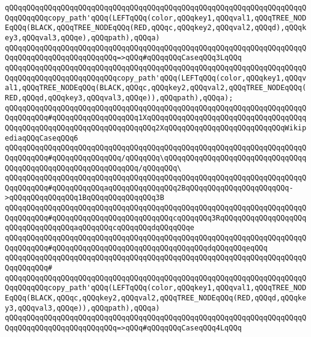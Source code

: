 \verb|qQQqqQQqqQQqqQQqqQQqqQQqqQQqqQQqqQQqqQQqqQQqqQQqqQQqqQQqqQQqqQQqqQQqqQQqqQQqqQQqcopy_path'qQQq(LEFTqQQq(color,qQQqkey1,qQQqval1,qQQqTREE_NODEqQQq(BLACK,qQQqTREE_NODEqQQq(RED,qQQqc,qQQqkey2,qQQqval2,qQQqd),qQQqkey3,qQQqval3,qQQqe),qQQqpath),qQQqa)|\newline
\verb|qQQqqQQqqQQqqQQqqQQqqQQqqQQqqQQqqQQqqQQqqQQqqQQqqQQqqQQqqQQqqQQqqQQqqQQqqQQqqQQqqQQqqQQqqQQqqQQq=>qQQq#qQQqqQQqCaseqQQq3LqQQq|\newline
\verb|qQQqqQQqqQQqqQQqqQQqqQQqqQQqqQQqqQQqqQQqqQQqqQQqqQQqqQQqqQQqqQQqqQQqqQQqqQQqqQQqqQQqqQQqqQQqqQQqcopy_path'qQQq(LEFTqQQq(color,qQQqkey1,qQQqval1,qQQqTREE_NODEqQQq(BLACK,qQQqc,qQQqkey2,qQQqval2,qQQqTREE_NODEqQQq(RED,qQQqd,qQQqkey3,qQQqval3,qQQqe)),qQQqpath),qQQqa);|\newline
\newline
\verb|qQQqqQQqqQQqqQQqqQQqqQQqqQQqqQQqqQQqqQQqqQQqqQQqqQQqqQQqqQQqqQQqqQQqqQQqqQQqqQQq#qQQqqQQqqQQqqQQqqQQq1XqQQqqQQqqQQqqQQqqQQqqQQqqQQqqQQqqQQqqQQqqQQqqQQqqQQqqQQqqQQqqQQqqQQqqQQq2XqQQqqQQqqQQqqQQqqQQqqQQqqQQqWikipediaqQQqCaseqQQq6|\newline
\verb|qQQqqQQqqQQqqQQqqQQqqQQqqQQqqQQqqQQqqQQqqQQqqQQqqQQqqQQqqQQqqQQqqQQqqQQqqQQqqQQq#qQQqqQQqqQQqqQQq/qQQqqQQq\qQQqqQQqqQQqqQQqqQQqqQQqqQQqqQQqqQQqqQQqqQQqqQQqqQQqqQQqqQQqqQQq/qQQqqQQq\|\newline
\verb|qQQqqQQqqQQqqQQqqQQqqQQqqQQqqQQqqQQqqQQqqQQqqQQqqQQqqQQqqQQqqQQqqQQqqQQqqQQqqQQq#qQQqqQQqqQQqaqQQqqQQqqQQqqQQq2BqQQqqQQqqQQqqQQqqQQqqQQq->qQQqqQQqqQQqqQQq1BqQQqqQQqqQQqqQQq3B|\newline
\verb|qQQqqQQqqQQqqQQqqQQqqQQqqQQqqQQqqQQqqQQqqQQqqQQqqQQqqQQqqQQqqQQqqQQqqQQqqQQqqQQq#qQQqqQQqqQQqqQQqqQQqqQQqqQQqcqQQqqQQq3RqQQqqQQqqQQqqQQqqQQqqQQqqQQqqQQqqQQqaqQQqqQQqcqQQqqQQqdqQQqqQQqe|\newline
\verb|qQQqqQQqqQQqqQQqqQQqqQQqqQQqqQQqqQQqqQQqqQQqqQQqqQQqqQQqqQQqqQQqqQQqqQQqqQQqqQQq#qQQqqQQqqQQqqQQqqQQqqQQqqQQqqQQqqQQqdqQQqqQQqeqQQq|\newline
\verb|qQQqqQQqqQQqqQQqqQQqqQQqqQQqqQQqqQQqqQQqqQQqqQQqqQQqqQQqqQQqqQQqqQQqqQQqqQQqqQQq#|\newline
\verb|qQQqqQQqqQQqqQQqqQQqqQQqqQQqqQQqqQQqqQQqqQQqqQQqqQQqqQQqqQQqqQQqqQQqqQQqqQQqqQQqcopy_path'qQQq(LEFTqQQq(color,qQQqkey1,qQQqval1,qQQqTREE_NODEqQQq(BLACK,qQQqc,qQQqkey2,qQQqval2,qQQqTREE_NODEqQQq(RED,qQQqd,qQQqkey3,qQQqval3,qQQqe)),qQQqpath),qQQqa)|\newline
\verb|qQQqqQQqqQQqqQQqqQQqqQQqqQQqqQQqqQQqqQQqqQQqqQQqqQQqqQQqqQQqqQQqqQQqqQQqqQQqqQQqqQQqqQQqqQQqqQQq=>qQQq#qQQqqQQqCaseqQQq4LqQQq|\newline
